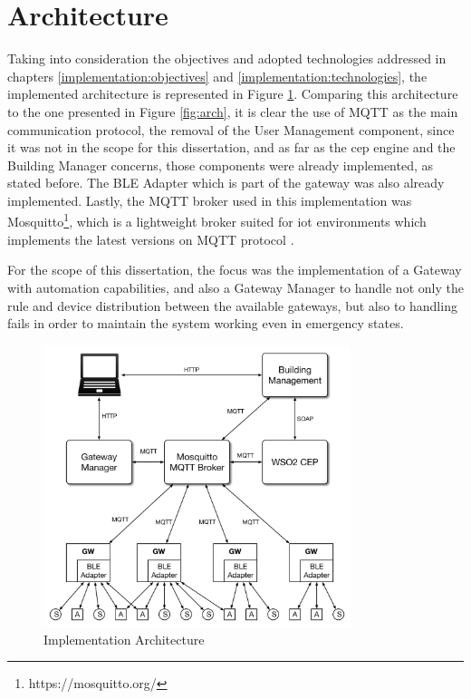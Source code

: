 	
\section{Architecture}
\label{implementation:architecture}
Taking into consideration the objectives and adopted technologies addressed in chapters \ref{implementation:objectives} and \ref{implementation:technologies}, the implemented architecture is represented in Figure \ref{fig:arch2}. Comparing this architecture to the one presented in Figure \ref{fig:arch}, it is clear the use of MQTT as the main communication protocol, the removal of the User Management component, since it was not in the scope for this dissertation, and as far as the \ac{cep} engine and the Building Manager concerns, those components were already implemented, as stated before. The BLE Adapter which is part of the gateway was also already implemented. Lastly, the MQTT broker used in this implementation was Mosquitto\footnote{https://mosquitto.org/}, which is a lightweight broker suited for \ac{iot} environments which implements the latest versions on MQTT protocol . 

For the scope of this dissertation, the focus was the implementation of a Gateway with automation capabilities, and also a Gateway Manager to handle not only the rule and device distribution between the available gateways, but also to handling fails in order to maintain the system working even in emergency states.


\begin{figure}[H]
	\centering
	\includegraphics[width=0.8\textwidth]{figures/architecture3.png}
	\caption{Implementation Architecture}
	\label{fig:arch2}
\end{figure}

